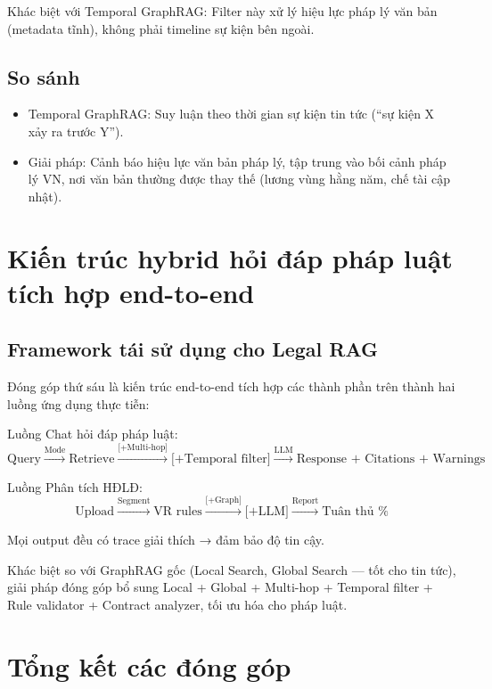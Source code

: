 \documentclass[../DoAn.tex]{subfiles}
\begin{document}
Khác biệt với Temporal GraphRAG: Filter này xử lý hiệu lực pháp lý văn bản (metadata tĩnh), không phải timeline sự kiện bên ngoài.

\subsection{So sánh}
\label{subsection:5.4.3}

\begin{itemize}[nosep, leftmargin=*]
    \item Temporal GraphRAG: Suy luận theo thời gian sự kiện tin tức (``sự kiện X xảy ra trước Y'').
    
    \item Giải pháp: Cảnh báo hiệu lực văn bản pháp lý, tập trung vào bối cảnh pháp lý VN, nơi văn bản thường được thay thế (lương vùng hằng năm, chế tài cập nhật).
\end{itemize}


\section{Kiến trúc hybrid hỏi đáp pháp luật tích hợp end-to-end}
\label{section:5.5}

\subsection{Framework tái sử dụng cho Legal RAG}
\label{subsection:5.5.1}

Đóng góp thứ sáu là kiến trúc end-to-end tích hợp các thành phần trên thành hai luồng ứng dụng thực tiễn:

Luồng Chat hỏi đáp pháp luật:
\[
\text{Query} \xrightarrow{\text{Mode}} \text{Retrieve} \xrightarrow{\text{[+Multi-hop]}} \text{[+Temporal filter]} \xrightarrow{\text{LLM}} \text{Response + Citations + Warnings}
\]

Luồng Phân tích HĐLĐ:
\[
\text{Upload} \xrightarrow{\text{Segment}} \text{VR rules} \xrightarrow{\text{[+Graph]}} \text{[+LLM]} \xrightarrow{\text{Report}} \text{Tuân thủ \%}
\]

Mọi output đều có trace giải thích → đảm bảo độ tin cậy.

Khác biệt so với GraphRAG gốc (Local Search, Global Search --- tốt cho tin tức), giải pháp đóng góp bổ sung Local + Global + Multi-hop + Temporal filter + Rule validator + Contract analyzer, tối ưu hóa cho pháp luật.

\section{Tổng kết các đóng góp}
\label{section:5.6}
\end{document}
